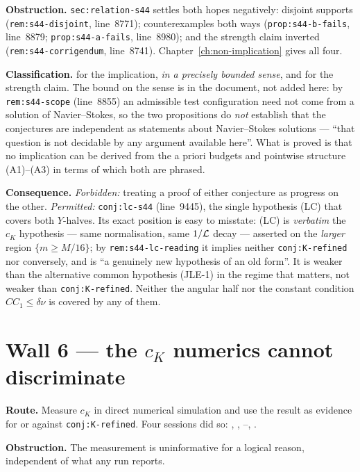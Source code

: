 \textbf{Obstruction.} \texttt{sec:relation-s44} settles both hopes negatively:
disjoint supports (\texttt{rem:s44-disjoint}, line~8771); counterexamples both
ways (\texttt{prop:s44-b-fails}, line~8879; \texttt{prop:s44-a-fails},
line~8980); and the strength claim inverted
(\texttt{rem:s44-corrigendum}, line~8741). Chapter~\ref{ch:non-implication}
gives all four.

\textbf{Classification.} \IMPOSSIBLE{} for the implication, \emph{in a
precisely bounded sense}, and \WITHDRAWN{} for the strength claim. The bound on
the sense is in the document, not added here: by \texttt{rem:s44-scope}
(line~8855) an admissible test configuration need not come from a solution of
Navier--Stokes, so the two propositions do \emph{not} establish that the
conjectures are independent as statements about Navier--Stokes solutions ---
``that question is not decidable by any argument available here''. What is
proved is that no implication can be derived from the a priori budgets and
pointwise structure (A1)--(A3) in terms of which both are phrased.

\textbf{Consequence.} \emph{Forbidden:} treating a proof of either conjecture
as progress on the other. \emph{Permitted:} \texttt{conj:lc-s44} (line~9445),
the single hypothesis (LC) that covers both \(Y\)-halves. Its exact position is
easy to misstate: (LC) is \emph{verbatim} the \(c_K\) hypothesis --- same
normalisation, same \(1/\mathcal{L}\) decay --- asserted on the \emph{larger} region
\(\{m\ge M/16\}\); by \texttt{rem:s44-lc-reading} it implies neither
\texttt{conj:K-refined} nor conversely, and is ``a genuinely new hypothesis of
an old form''. It is weaker than the alternative common hypothesis (JLE-1) in
the regime that matters, not weaker than \texttt{conj:K-refined}. Neither the
angular half nor the constant condition \(CC_1\le\delta\nu\) is covered by any
of them.

\section{Wall 6 --- the \texorpdfstring{\(c_K\)}{c\_K} numerics cannot discriminate}
\label{sec:wall6-walls}

\textbf{Route.} Measure \(c_K\) in direct numerical simulation and use the
result as evidence for or against \texttt{conj:K-refined}. Four sessions did
so: , , --, .

\textbf{Obstruction.} The measurement is uninformative for a logical reason,
independent of what any run reports.

